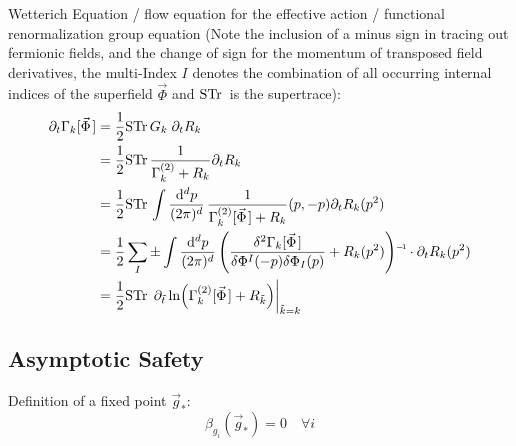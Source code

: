 		\noindent
		Wetterich Equation / flow equation for the effective action / functional renormalization group equation (Note the inclusion of a minus sign in tracing out fermionic fields, and the change of sign for the momentum of transposed field derivatives, the multi-Index $I$ denotes the combination of all occurring internal indices of the superfield $\vec{\Phi}$ and $\mathrm{STr}\,$ is the supertrace):
		\begin{equation}
			\begin{aligned}
				\partial_t \Gamma_k[\vec{\Phi}]
				&= \frac{1}{2} \Str G_k \;\partial_t R_k \\
				&= \frac{1}{2} \Str \frac{1}{\Gamma^{(2)}_k + R_k} \partial_t R_k \\
				&= \frac{1}{2} \Str \int \frac{\dd^d p}{(2\pi)^d} \, \frac{1}{\Gamma^{(2)}_k[\vec{\Phi}] + R_k}(p,-p) \partial_t R_k(p^2) \\
				&= \frac{1}{2} \sum_I \pm \int \frac{\dd^d p}{(2\pi)^d} \, \inv{\qty(\frac{\delta^2 \Gamma_k[\vec{\Phi}]}{\delta \Phi^I(-p) \delta \Phi_I(p)} + R_k(p^2))} \cdot \partial_t R_k(p^2) \\
				&= \frac{1}{2} \Str \eval{\partial_{\tilde{t}} \ln(\Gamma^{(2)}_k[\vec{\Phi}] + R_{\tilde{k}})}_{\tilde{k} = k}
			\end{aligned}
		\end{equation}

	\subsection{Asymptotic Safety}
		\noindent
		Definition of a fixed point $\vec{g}_{*}$:
		\begin{equation}
			\beta_{g_i}(\vec{g}_{*}) = 0 \quad \forall i
		\end{equation}


